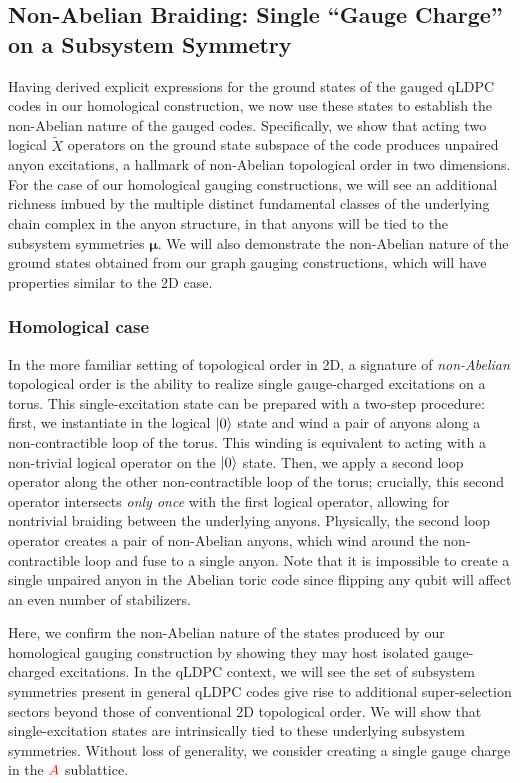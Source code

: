 \documentclass[aps,prx,reprint,superscriptaddress,nofootinbib]{revtex4-2}
\theoremstyle{definition}
\newcommand{\AR}[1]{\textcolor{red}{#1}}
\newcommand{\<}{\langle}
\renewcommand{\>}{\rangle}
\begin{document}
\subsection{Non-Abelian Braiding: Single ``Gauge Charge'' on a Subsystem Symmetry}
Having derived explicit expressions for the ground states of the gauged qLDPC codes in our homological construction, we now use these states to establish the non-Abelian nature of the gauged codes. Specifically, we show that acting two logical $\tilde{X}$ operators on the ground state subspace of the code produces unpaired anyon excitations, a hallmark of non-Abelian topological order in two dimensions. For the case of our homological gauging constructions, we will see an additional richness imbued by the multiple distinct fundamental classes of the underlying chain complex in the anyon structure, in that anyons will be tied to the subsystem symmetries $\bm{\mu}$. We will also demonstrate the non-Abelian nature of the ground states obtained from our graph gauging constructions, which will have properties similar to the 2D case.

\subsubsection{Homological case}
In the more familiar setting of topological order in 2D, a signature of \textit{non-Abelian} topological order is the ability to realize single gauge-charged excitations on a torus. This single-excitation state can be prepared with a two-step procedure: first, we instantiate in the logical $\ket{0}$ state and wind a pair of anyons along a non-contractible loop of the torus. This winding is equivalent to acting with a non-trivial logical operator on the $\ket{0}$ state.
Then, we apply a second loop operator along the other non-contractible loop of the torus; crucially, this second operator intersects \textit{only once} with the first logical operator, allowing for nontrivial braiding between the underlying anyons. Physically, the second loop operator creates a pair of non-Abelian anyons, which wind around the non-contractible loop and fuse to a single anyon. 
%
Note that it is impossible to create a single unpaired anyon in the Abelian toric code since flipping any qubit will affect an even number of stabilizers.


Here, we confirm the non-Abelian nature of the states produced by our homological gauging construction by showing they may host isolated gauge-charged excitations. In the qLDPC context, we will see the set of subsystem symmetries present in general qLDPC codes give rise to additional super-selection sectors beyond those of conventional 2D topological order. We will show that single-excitation states are intrinsically tied to these underlying subsystem symmetries. Without loss of generality, we consider creating a single gauge charge in the $\AR{A}$ sublattice. 
\end{document}
